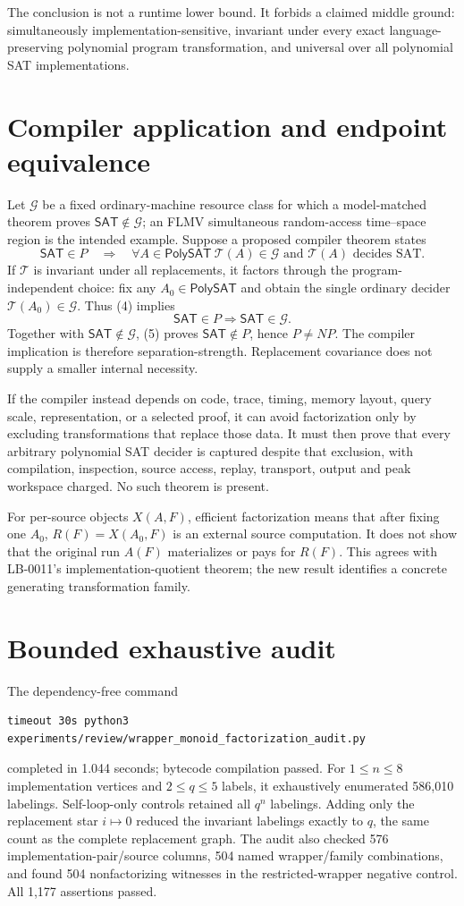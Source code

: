 \documentclass[11pt]{article}
\newcommand{\SAT}{\mathsf{SAT}}
\newcommand{\PolySAT}{\mathsf{PolySAT}}
\begin{document}
The conclusion is not a runtime lower bound. It forbids a claimed middle
ground: simultaneously implementation-sensitive, invariant under every exact
language-preserving polynomial program transformation, and universal over
all polynomial SAT implementations.

\section{Compiler application and endpoint equivalence}
Let \(\mathcal G\) be a fixed ordinary-machine resource class for which a
model-matched theorem proves \(\SAT\notin\mathcal G\); an FLMV simultaneous
random-access time--space region is the intended example. Suppose a proposed
compiler theorem states
\[
 \SAT\in P\quad\Longrightarrow\quad
 \forall A\in\PolySAT\ \mathcal T(A)\in\mathcal G
 \text{ and }\mathcal T(A)\text{ decides SAT}.
 \tag{4}
\]
If \(\mathcal T\) is invariant under all replacements, it factors through the
program-independent choice: fix any \(A_0\in\PolySAT\) and obtain the single
ordinary decider \(\mathcal T(A_0)\in\mathcal G\). Thus (4) implies
\[
 \SAT\in P\Longrightarrow\SAT\in\mathcal G.
 \tag{5}
\]
Together with \(\SAT\notin\mathcal G\), (5) proves \(\SAT\notin P\), hence
\(P\ne NP\). The compiler implication is therefore separation-strength.
Replacement covariance does not supply a smaller internal necessity.

If the compiler instead depends on code, trace, timing, memory layout, query
scale, representation, or a selected proof, it can avoid factorization only
by excluding transformations that replace those data. It must then prove
that every arbitrary polynomial SAT decider is captured despite that
exclusion, with compilation, inspection, source access, replay, transport,
output and peak workspace charged. No such theorem is present.

For per-source objects \(X(A,F)\), efficient factorization means that after
fixing one \(A_0\), \(R(F)=X(A_0,F)\) is an external source computation. It
does not show that the original run \(A(F)\) materializes or pays for
\(R(F)\). This agrees with LB-0011's implementation-quotient theorem; the new
result identifies a concrete generating transformation family.

\section{Bounded exhaustive audit}
The dependency-free command
\begin{verbatim}
timeout 30s python3 experiments/review/wrapper_monoid_factorization_audit.py
\end{verbatim}
completed in 1.044 seconds; bytecode compilation passed. For
\(1\le n\le8\) implementation vertices and \(2\le q\le5\) labels, it
exhaustively enumerated 586,010 labelings. Self-loop-only controls retained
all \(q^n\) labelings. Adding only the replacement star \(i\mapsto0\)
reduced the invariant labelings exactly to \(q\), the same count as the
complete replacement graph. The audit also checked 576
implementation-pair/source columns, 504 named wrapper/family combinations,
and found 504 nonfactorizing witnesses in the restricted-wrapper negative
control. All 1,177 assertions passed.
\end{document}
